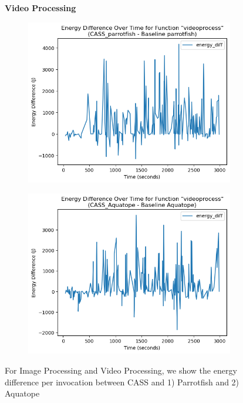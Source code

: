 \documentclass[times, 10pt,twocolumn]{article}
\begin{document}
\begin{figure}[ht]
   \textbf{Video Processing}\par\medskip
   \begin{subfigure}{0.4\textwidth}
      \includegraphics[width=\textwidth]{imgs/final_experiment_plots/energy_comparison/parrotfish/videoprocess.png}
     \caption{}
     \label{fig:video_energy_diff_parrotfish}
   \end{subfigure}
   \hfill
   \begin{subfigure}{0.4\textwidth}
      \includegraphics[width=\textwidth]{imgs/final_experiment_plots/energy_comparison/aquatope/videoprocess.png}
     \caption{}
     \label{fig:video_energy_diff_aquatope}
   \end{subfigure}
   \caption{For Image Processing and Video Processing, we show the energy difference per invocation between CASS and 1) Parrotfish and 2) Aquatope}
   \label{fig:end_to_end_per_invocation}
   
\end{figure}
\end{document}
